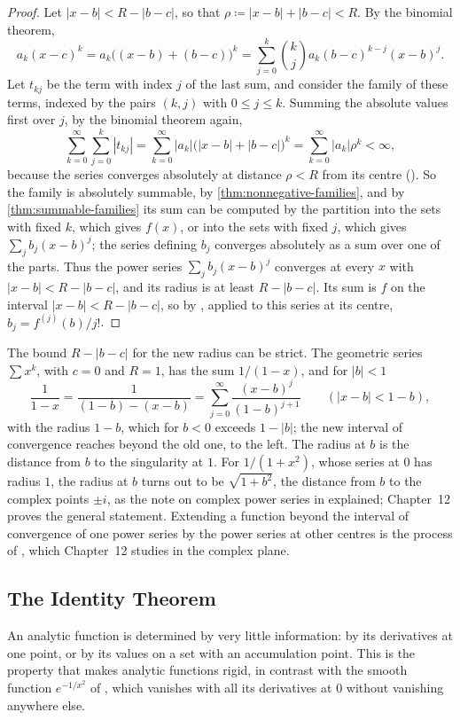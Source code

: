\begin{proof}
Let $|x-b|<R-|b-c|$, so that $\rho\coloneqq|x-b|+|b-c|<R$. By the binomial theorem,
\[
a_k(x-c)^k=a_k\bigl((x-b)+(b-c)\bigr)^k=\sum_{j=0}^k\binom kja_k(b-c)^{k-j}(x-b)^j .
\]
Let $t_{kj}$ be the term with index $j$ of the last sum, and consider the family of these terms, indexed by the pairs $(k,j)$ with $0\le j\le k$. Summing the absolute values first over $j$, by the binomial theorem again,
\[
\sum_{k=0}^\infty\sum_{j=0}^k|t_{kj}|=\sum_{k=0}^\infty|a_k|\bigl(|x-b|+|b-c|\bigr)^k=\sum_{k=0}^\infty|a_k|\rho^k<\infty ,
\]
because the series converges absolutely at distance $\rho<R$ from its centre (). So the family is absolutely summable, by \cref{thm:nonnegative-families}, and by \cref{thm:summable-families} its sum can be computed by the partition into the sets with fixed $k$, which gives $f(x)$, or into the sets with fixed $j$, which gives $\sum_jb_j(x-b)^j$; the series defining $b_j$ converges absolutely as a sum over one of the parts. Thus the power series $\sum_jb_j(x-b)^j$ converges at every $x$ with $|x-b|<R-|b-c|$, and its radius is at least $R-|b-c|$. Its sum is $f$ on the interval $|x-b|<R-|b-c|$, so by , applied to this series at its centre, $b_j=f^{(j)}(b)/j!$.
\end{proof}

The bound $R-|b-c|$ for the new radius can be strict. The geometric series $\sum x^k$, with $c=0$ and $R=1$, has the sum $1/(1-x)$, and for $|b|<1$
\[
\frac1{1-x}=\frac1{(1-b)-(x-b)}=\sum_{j=0}^\infty\frac{(x-b)^j}{(1-b)^{j+1}}\qquad(|x-b|<1-b),
\]
with the radius $1-b$, which for $b<0$ exceeds $1-|b|$; the new interval of convergence reaches beyond the old one, to the left. The radius at $b$ is the distance from $b$ to the singularity at $1$. For $1/(1+x^2)$, whose series at $0$ has radius $1$, the radius at $b$ turns out to be $\sqrt{1+b^2}$, the distance from $b$ to the complex points $\pm i$, as the note on complex power series in  explained; Chapter~12 proves the general statement. Extending a function beyond the interval of convergence of one power series by the power series at other centres is the process of , which Chapter~12 studies in the complex plane.

\subsection{The Identity Theorem}

An analytic function is determined by very little information: by its derivatives at one point, or by its values on a set with an accumulation point. This is the property that makes analytic functions rigid, in contrast with the smooth function $e^{-1/x^2}$ of , which vanishes with all its derivatives at $0$ without vanishing anywhere else.

